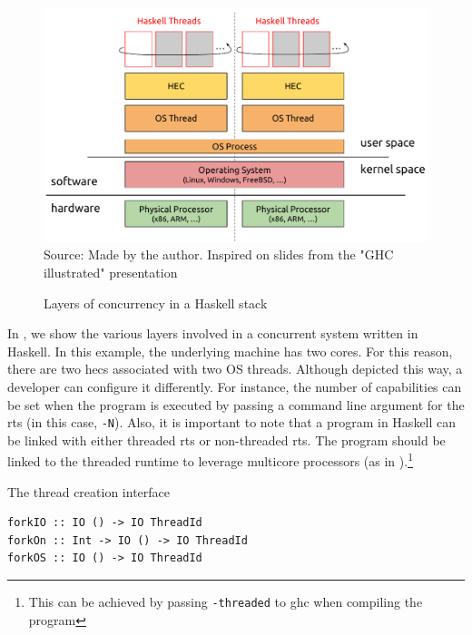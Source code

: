 \begin{figure}[htp]
  \centering
  \caption{Layers of concurrency in a Haskell stack}
  \includegraphics[width=\columnwidth]{images/haskell-concurrency-layers}
  \footnotesize{Source: Made by the author. Inspired on slides from the "GHC illustrated" presentation~\cite{takenobu:2015}}
  \label{fig:haskell-conc-layers}
\end{figure}

In , we show the various layers involved in a concurrent system written in Haskell. In this example, the underlying machine has two cores. For this reason, there are two \acp{hec} associated with two OS threads. Although depicted this way, a developer can configure it differently. For instance, the number of capabilities can be set when the program is executed  by passing a command line argument for the \ac{rts} (in this case, \texttt{-N}). Also, it is important to note that a program in Haskell can be linked with either threaded \ac{rts} or non-threaded \ac{rts}. The program should be linked to the threaded runtime to leverage multicore processors (as in ).\footnote{This can be achieved by passing \texttt{-threaded} to \ac{ghc} when compiling the program}

\begin{listing}
  \caption{The thread creation interface}
  \begin{verbatim}
forkIO :: IO () -> IO ThreadId
forkOn :: Int -> IO () -> IO ThreadId
forkOS :: IO () -> IO ThreadId
  \end{verbatim}
  \label{code:fork-sig}
\end{listing}

